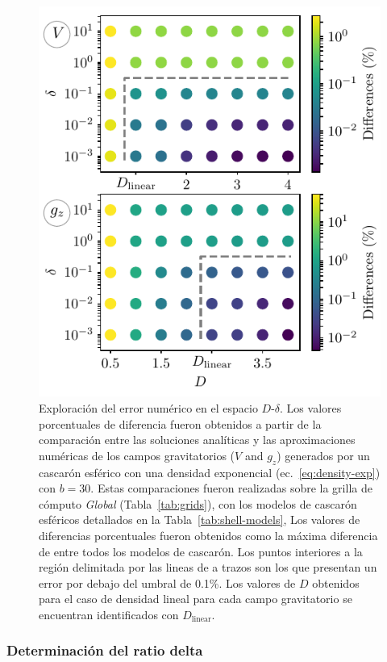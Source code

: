 \begin{figure}
\centering
\includegraphics[width=0.5\linewidth]
    {figs/tesseroids-variable-density/grid-search.pdf}
\caption{
    Exploración del error numérico en el espacio $D$-$\delta$.
    Los valores porcentuales de diferencia fueron obtenidos a partir de la
    comparación entre las soluciones analíticas y las aproximaciones numéricas
    de los campos gravitatorios ($V$ and $g_z$) generados por un cascarón
    esférico con una densidad exponencial
    (ec.~\ref{eq:density-exp}) con $b=30$.
    Estas comparaciones fueron realizadas sobre la grilla de cómputo \emph{Global} (Tabla~\ref{tab:grids}),
    con los modelos de cascarón esféricos detallados en la Tabla~\ref{tab:shell-models},
    Los valores de diferencias porcentuales fueron obtenidos como la máxima
    diferencia de entre todos los modelos de cascarón.
    Los puntos interiores a la región delimitada por las lineas de a trazos son
    los que presentan un error por debajo del umbral de 0.1\%.
    Los valores de $D$ obtenidos para el caso de densidad lineal para cada
    campo gravitatorio se encuentran identificados con $D_\text{linear}$.
    }
\label{fig:grid-search}
\end{figure}


\subsubsection{Determinación del ratio delta}


